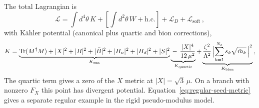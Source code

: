 \documentclass[12pt,a4paper]{article}
\begin{document}
The total Lagrangian is
%
\begin{equation*}
  \mathcal{L}
  = \int\!d^4\theta\,K
  + \left[\int\!d^2\theta\,W + \text{h.c.}\right]
  + \mathcal{L}_D
  + \mathcal{L}_{\text{soft}}\,,
\end{equation*}
%
with K\"ahler potential (canonical plus quartic and bion corrections),
%
\begin{equation*}
  K = \underbrace{\operatorname{Tr}(M^\dagger M) + |X|^2 + |B|^2
    + |\bar B|^2 + |H_u|^2 + |H_d|^2 + |S|^2}_{K_{\text{can}}}
  \underbrace{{}-\,\frac{|X|^4}{12\,\mu^2}}_{K_{\text{quartic}}}
  + \underbrace{\frac{\zeta^2}{\Lambda^2}\,
    \Bigl|\sum_{k=1}^{N_c} s_k \sqrt{\hat m_k}\,\Bigr|^2}_{K_{\text{bion}}}\,,
\end{equation*}
The quartic term gives a zero of the $X$ metric at $|X|=\sqrt3\,\mu$.
On a branch with nonzero $F_X$ this point has divergent potential.
Equation~\eqref{eq:regular-seed-metric} gives a separate regular example
in the rigid pseudo-modulus model.
\end{document}
